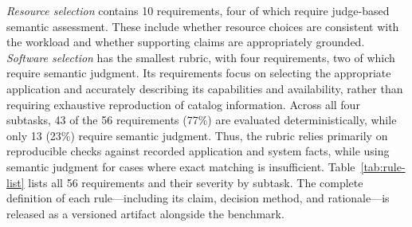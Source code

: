 \documentclass[conference]{IEEEtran}
\begin{document}
\emph{Resource selection} contains 10 requirements, four of which require judge-based semantic assessment. These include whether resource choices are consistent with the workload and whether supporting claims are appropriately grounded. \emph{Software selection} has the smallest rubric, with four requirements, two of which require semantic judgment. Its requirements focus on selecting the appropriate application and accurately describing its capabilities and availability, rather than requiring exhaustive reproduction of catalog information.
Across all four subtasks, 43 of the 56 requirements (77\%) are evaluated deterministically, while only 13 (23\%) require semantic judgment. Thus, the rubric relies primarily on reproducible checks against recorded application and system facts, while using semantic judgment for cases where exact matching is insufficient. Table~\ref{tab:rule-list} lists all 56 requirements and their severity by subtask. The complete definition of each rule---including its claim, decision method, and rationale---is released as a versioned artifact alongside the benchmark.
\end{document}
